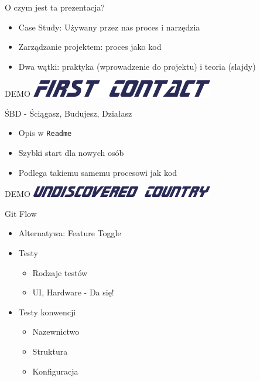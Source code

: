 \documentclass[ignorenonframetext]{beamer}
\begin{document}
\begin{frame}{O czym jest ta prezentacja?}
\begin{itemize}
	\item Case Study: Używany przez nas proces i narzędzia
	\item Zarządzanie projektem: proces jako kod
	\item Dwa wątki: praktyka (wprowadzenie do projektu) i teoria (slajdy)
\end{itemize}
\end{frame}

\begin{frame}{DEMO}
\centering
\includegraphics[width=8cm]{images/first-contact.png}
\end{frame}

\begin{frame}{ŚBD - Ściągasz, Budujesz, Działasz}
\begin{itemize}
	\item Opis w \texttt{Readme}
	\item Szybki start dla nowych osób
	\item Podlega takiemu samemu procesowi jak kod
\end{itemize}
\end{frame}

\begin{frame}{DEMO}
	\centering
	\includegraphics[width=8cm]{images/undiscovered-country.png}
\end{frame}

\begin{frame}{Git Flow}
\begin{itemize}
	\item Alternatywa: Feature Toggle
	\item Testy
	\begin{itemize}
		\item Rodzaje testów
		\item UI, Hardware - Da się! 
	\end{itemize}
	\item Testy konwencji
	\begin{itemize}
		\item Nazewnictwo
		\item Struktura
		\item Konfiguracja
	\end{itemize}
\end{itemize}
\end{frame}
\end{document}
